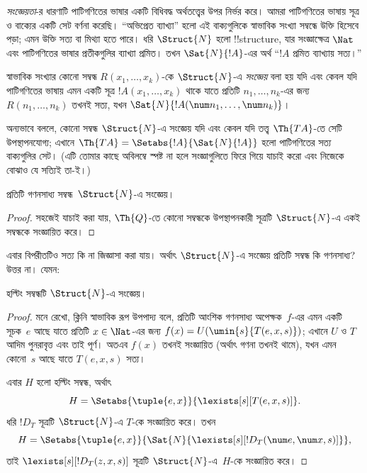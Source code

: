 \documentclass[../../../include/open-logic-section]{subfiles}
\begin{document}


\emph{সংজ্ঞেয়তা}-র ধারণাটি পাটিগণিতের ভাষার একটি বিধিবদ্ধ অর্থতত্ত্বের
উপর নির্ভর করে। আমরা পাটিগণিতের ভাষায় সূত্র ও বাক্যের একটি সেট বর্ণনা
করেছি। ``অভিপ্রেত ব্যাখ্যা'' হলো এই বাক্যগুলিকে স্বাভাবিক সংখ্যা সম্বন্ধে
উক্তি হিসেবে পড়া; এমন উক্তি সত্য বা মিথ্যা হতে পারে। ধরি $\Struct{N}$
হলো !!{structure}, যার সংজ্ঞাক্ষেত্র $\Nat$ এবং পাটিগণিতের ভাষার
প্রতীকগুলির ব্যাখ্যা প্রমিত। তখন $\Sat{N}{!A}$-এর অর্থ ``$!A$ প্রমিত
ব্যাখ্যায় সত্য।''

\begin{defn}
স্বাভাবিক সংখ্যার কোনো সম্বন্ধ $R(x_1,\dots,x_k)$-কে $\Struct{N}$-এ
\emph{সংজ্ঞেয়} বলা হয় যদি এবং কেবল যদি পাটিগণিতের ভাষায় এমন একটি
সূত্র $!A(x_1,\dots,x_k)$ থাকে যাতে প্রতিটি $n_1,\dots,n_k$-এর জন্য
$R(n_1,\dots,n_k)$ তখনই সত্য, যখন $\Sat{N}{!A(\num n_1,\dots,\num
  n_k)}$।
\end{defn}

অন্যভাবে বললে, কোনো সম্বন্ধ $\Struct{N}$-এ সংজ্ঞেয় যদি এবং কেবল যদি
তত্ত্ব $\Th{TA}$-তে সেটি উপস্থাপনযোগ্য; এখানে $\Th{TA} =
\Setabs{!A}{\Sat{N}{!A}}$ হলো পাটিগণিতের সত্য বাক্যগুলির সেট। (এটি
তোমার কাছে অবিলম্বে স্পষ্ট না হলে সংজ্ঞাগুলিতে ফিরে গিয়ে যাচাই করো এবং
নিজেকে বোঝাও যে সত্যিই তা-ই।)

\begin{lem}
প্রতিটি গণনসাধ্য সম্বন্ধ~$\Struct{N}$-এ সংজ্ঞেয়।
\end{lem}

\begin{proof}
সহজেই যাচাই করা যায়, $\Th{Q}$-তে কোনো সম্বন্ধকে উপস্থাপনকারী সূত্রটি
$\Struct{N}$-এ একই সম্বন্ধকে সংজ্ঞায়িত করে।
\end{proof}

এবার বিপরীতটিও সত্য কি না জিজ্ঞাসা করা যায়। অর্থাৎ $\Struct{N}$-এ
সংজ্ঞেয় প্রতিটি সম্বন্ধ কি গণনসাধ্য? উত্তর না। যেমন:

\begin{lem}
হল্টিং সম্বন্ধটি $\Struct{N}$-এ সংজ্ঞেয়।
\end{lem}

\begin{proof}
মনে রেখো, ক্লিনি স্বাভাবিক রূপ উপপাদ্য বলে, প্রতিটি আংশিক গণনসাধ্য
অপেক্ষক~$f$-এর এমন একটি সূচক~$e$ আছে যাতে প্রতিটি $x \in \Nat$-এর জন্য
$f(x) = U(\umin{s}{T(e,x,s)})$; এখানে $U$ ও $T$ আদিম পুনরাবৃত্ত এবং তাই
পূর্ণ। অতএব $f(x)$ তখনই সংজ্ঞায়িত (অর্থাৎ গণনা তখনই থামে), যখন এমন
কোনো~$s$ আছে যাতে $T(e,x,s)$ সত্য।

এবার $H$ হলো হল্টিং সম্বন্ধ, অর্থাৎ
\[
H = \Setabs{\tuple{e,x}}{\lexists[s][T(e, x, s)]}.
\]
ধরি $!D_T$ সূত্রটি $\Struct{N}$-এ $T$-কে সংজ্ঞায়িত করে। তখন
\[
H = \Setabs{\tuple{e,x}}{\Sat{N}{\lexists[s][!D_T(\num e, \num x, s)]}},
\]
তাই $\lexists[s][!D_T(z, x, s)]$ সূত্রটি $\Struct{N}$-এ~$H$-কে
সংজ্ঞায়িত করে।
\end{proof}
\end{document}
